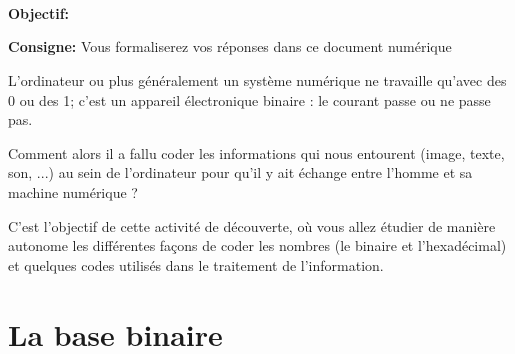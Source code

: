 \documentclass{article}
\begin{document}
\begin{center}
	\begin{flushright}
		\begin{Form}
			\\
			\\
			\\
		\end{Form}
	\end{flushright}

	\vspace{1em}
	\Large
	\textbf{Objectif:} 

	\vspace{2em}
	\large
	\textbf{Consigne:} Vous formaliserez vos réponses dans ce document numérique
\end{center}
	\vspace{1em}

	L'ordinateur ou plus généralement un système numérique ne travaille qu'avec des \og{}0\fg{} ou des \og{}1\fg{}; 
	c'est un appareil électronique \og{}binaire\fg{} : le courant passe ou ne passe pas.

	Comment alors il a fallu coder les informations qui nous entourent (image, texte, son, ...) au
	sein de l'ordinateur pour qu'il y ait échange entre l'homme et sa machine numérique ?

	C'est l'objectif de cette activité de découverte, où vous allez étudier de manière autonome les
	différentes façons de coder les nombres (le binaire et l'hexadécimal) et quelques codes utilisés
	dans le traitement de l'information.

\section{La base binaire}
\end{document}
